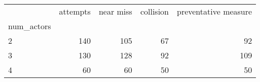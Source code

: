 \begin{tabular}{lrrrr}
\toprule
{} &  attempts &  near miss &  collision &  preventative measure \\
num\_actors &           &            &            &                       \\
\midrule
2          &       140 &        105 &         67 &                    92 \\
3          &       130 &        128 &         92 &                   109 \\
4          &        60 &         60 &         50 &                    50 \\
\bottomrule
\end{tabular}
